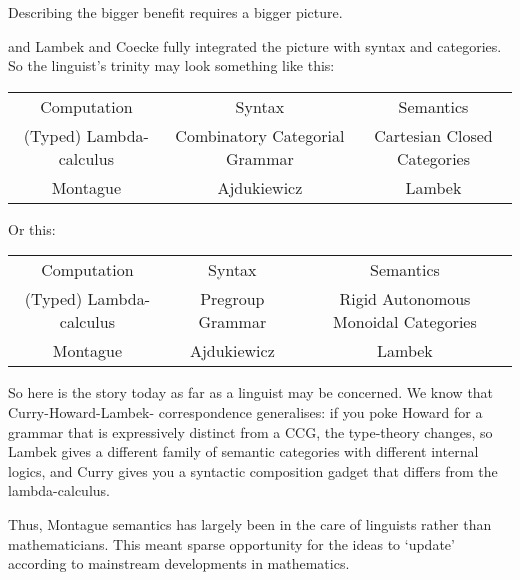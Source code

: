 Describing the bigger benefit requires a bigger picture. 


and Lambek and Coecke fully integrated the picture with syntax and categories. So the linguist's trinity may look something like this:

\begin{table}[]
\begin{tabular}{ccc}
Computation & Syntax & Semantics \\
(Typed) Lambda-calculus & Combinatory Categorial Grammar & Cartesian Closed Categories \\
Montague & Ajdukiewicz & Lambek
\end{tabular}
\end{table}

Or this:

\begin{table}[]
\begin{tabular}{ccc}
Computation & Syntax & Semantics \\
(Typed) Lambda-calculus & Pregroup Grammar & Rigid Autonomous Monoidal Categories \\
Montague & Ajdukiewicz & Lambek
\end{tabular}
\end{table}

So here is the story today as far as a linguist may be concerned. We know that Curry-Howard-Lambek- correspondence generalises: if you poke Howard for a grammar that is expressively distinct from a CCG, the type-theory changes, so Lambek gives a different family of semantic categories with different internal logics, and Curry gives you a syntactic composition gadget that differs from the lambda-calculus.


 Thus, Montague semantics has largely been in the care of linguists rather than mathematicians. This meant sparse opportunity for the ideas to `update' according to mainstream developments in mathematics.\\